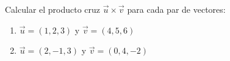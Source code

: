 Calcular el producto cruz $\vec{u} \times \vec{v}$ para cada par de vectores:
\begin{enumerate}
    \item $\vec{u} = (1, 2, 3)$ y $\vec{v} = (4, 5, 6)$
    \item $\vec{u} = (2, -1, 3)$ y $\vec{v} = (0, 4, -2)$
\end{enumerate}